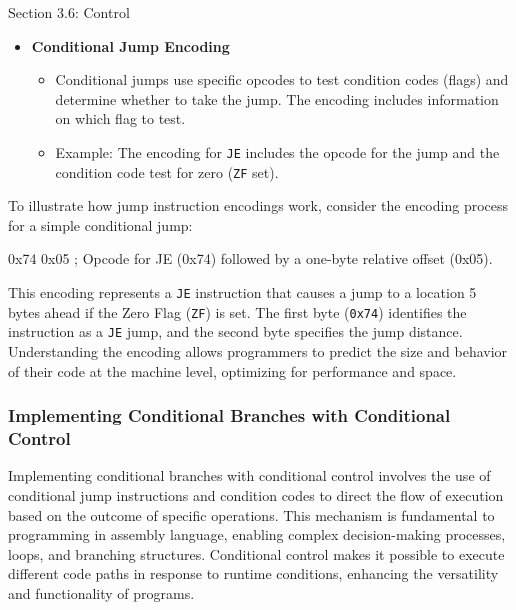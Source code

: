 \begin{notes}{Section 3.6: Control}
\begin{itemize}
\begin{itemize}
        \end{itemize}
        \item \textbf{Conditional Jump Encoding}
        \begin{itemize}
            \item Conditional jumps use specific opcodes to test condition codes (flags) and determine whether to take the jump. The encoding includes information on which flag to test.
            \item Example: The encoding for \texttt{JE} includes the opcode for the jump and the condition code test for zero (\texttt{ZF} set).
        \end{itemize}
    \end{itemize}
    
    \begin{highlight}
        To illustrate how jump instruction encodings work, consider the encoding process for a simple conditional jump:
    
    \begin{code}[Assembly]
    0x74 0x05   ; Opcode for JE (0x74) followed by a one-byte relative offset (0x05).
    \end{code}
    
        This encoding represents a \texttt{JE} instruction that causes a jump to a location 5 bytes ahead if the Zero Flag (\texttt{ZF}) is set. The first byte (\texttt{0x74}) identifies the instruction 
        as a \texttt{JE} jump, and the second byte specifies the jump distance. Understanding the encoding allows programmers to predict the size and behavior of their code at the machine level, 
        optimizing for performance and space.
    \end{highlight}

    \subsubsection*{Implementing Conditional Branches with Conditional Control}

    Implementing conditional branches with conditional control involves the use of conditional jump instructions and condition codes to direct the flow of execution based on the outcome of specific 
    operations. This mechanism is fundamental to programming in assembly language, enabling complex decision-making processes, loops, and branching structures. Conditional control makes it possible 
    to execute different code paths in response to runtime conditions, enhancing the versatility and functionality of programs.
    

\end{notes}
